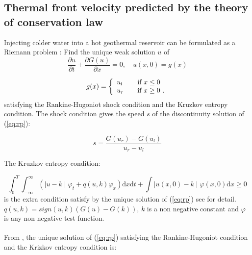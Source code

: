 
\subsection{Thermal front velocity predicted by the theory of conservation law}
Injecting colder water into a hot geothermal reservoir can be formulated as a Riemann problem : Find the unique weak solution $u$ of 
\begin{equation}\label{eq:rp}
\frac{\partial u}{\partial t} +\frac{ \partial G(u) }{\partial x}=0, \quad u(x,0)=g(x)
\end{equation}

\[ g(x) = \left\{ 
  \begin{array}{l l }
    u_{l} & \quad \text{if $x\leq 0$ }\\
    
    u_{r} & \quad \text{if $x\geq 0$ }.
  \end{array} \right.\]
satisfying the Rankine-Hugoniot shock condition and the Kruzkov entropy condition. The shock condition gives the speed $s$ of the discontinuity solution of (\ref{eq:rp}):

\begin{equation}\label{eq:rh}
s = \frac{G(u_{r})-G(u_{l})}{u_{r}-u_{l}}
\end{equation} 

The Kruzkov entropy condition:

\begin{equation}
\int_{0}^{T}\int_{-\infty}^{\infty}\left( \mid u-k \mid \varphi_{t}+q(u,k)\varphi_{x} \right) \mathrm{d}x \mathrm{d}t + \int \mid u(x,0)-k \mid \varphi(x,0) \mathrm{d}x  \geq 0 
\end{equation}
 is the extra condition satisfy by the unique solution of (\ref{eq:rp}) see \cite{Risebro07} for detail. $q(u,k)=sign(u,k)(G(u)-G(k))$, $k$ is a non negative constant and $\varphi$ is any non negative test function.\\
\\
From \cite{Risebro07}, the unique solution of (\ref{eq:rp}) satisfying the Rankine-Hugoniot condition and the Krizkov entropy condition is:


